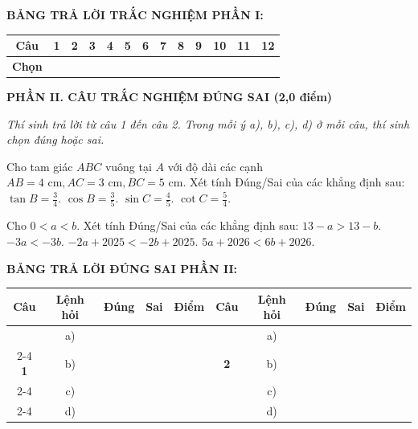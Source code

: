 \documentclass[12pt,a4paper]{article}
\begin{document}
\vspace{1mm}
\noindent\textbf{BẢNG TRẢ LỜI TRẮC NGHIỆM PHẦN I:}
\begin{center}
\begin{tabular}{|c|c|c|c|c|c|c|c|c|c|c|c|c|}
\hline
\textbf{Câu} & \textbf{1} & \textbf{2} & \textbf{3} & \textbf{4} & \textbf{5} & \textbf{6} & \textbf{7} & \textbf{8} & \textbf{9} & \textbf{10} & \textbf{11} & \textbf{12} \\
\hline
\textbf{Chọn} & \rule{0pt}{0.65cm} & & & & & & & & & & & \\
\hline
\end{tabular}
\end{center}
\vspace{2mm}

\noindent\textbf{\large PHẦN II. CÂU TRẮC NGHIỆM ĐÚNG SAI (2,0 điểm)}

\textit{Thí sinh trả lời từ câu 1 đến câu 2. Trong mỗi ý a), b), c), d) ở mỗi câu, thí sinh chọn đúng hoặc sai.}

\vspace{1mm}
\begin{ex}
Cho tam giác $ABC$ vuông tại $A$ với độ dài các cạnh $AB = 4\text{ cm}, AC = 3\text{ cm}, BC = 5\text{ cm}$. Xét tính Đúng/Sai của các khẳng định sau:
\choiceTF
{\True $\tan B = \frac{3}{4}$.}
{$\cos B = \frac{3}{5}$.}
{\True $\sin C = \frac{4}{5}$.}
{$\cot C = \frac{5}{4}$.}
\end{ex}

\begin{ex}
Cho $0 < a < b$. Xét tính Đúng/Sai của các khẳng định sau:
\choiceTF
{\True $13 - a > 13 - b$.}
{$-3a < -3b$.}
{$-2a + 2025 < -2b + 2025$.}
{\True $5a + 2026 < 6b + 2026$.}
\end{ex}


\vspace{1mm}
\noindent\textbf{BẢNG TRẢ LỜI ĐÚNG SAI PHẦN II:}
\begin{center}
\begin{tabular}{|c|c|c|c|c||c|c|c|c|c|}
\hline
\textbf{Câu} & \textbf{Lệnh hỏi} & \textbf{Đúng} & \textbf{Sai} & \textbf{Điểm} & \textbf{Câu} & \textbf{Lệnh hỏi} & \textbf{Đúng} & \textbf{Sai} & \textbf{Điểm} \\
\hline
 & a) & & & & & a) & & & \\
\cline{2-4}\cline{7-9}
\textbf{1} & b) & & & & \textbf{2} & b) & & & \\
\cline{2-4}\cline{7-9}
 & c) & & & & & c) & & & \\
\cline{2-4}\cline{7-9}
 & d) & & & & & d) & & & \\
\hline
\end{tabular}
\end{center}
\vspace{2mm}
\end{document}
